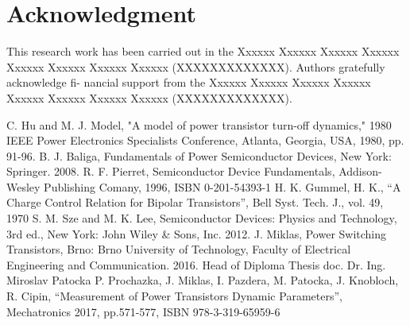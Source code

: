 \documentclass[conference]{IEEEtran}
\begin{document}
\section*{Acknowledgment}
This research work has been carried out in the Xxxxxx
Xxxxxx Xxxxxx Xxxxxx Xxxxxx Xxxxxx Xxxxxx Xxxxxx
(XXXXXXXXXXXXX). Authors gratefully acknowledge fi-
nancial support from the Xxxxxx Xxxxxx Xxxxxx Xxxxxx
Xxxxxx Xxxxxx Xxxxxx Xxxxxx (XXXXXXXXXXXXX).


\begin{thebibliography}{00}
	 C. Hu and M. J. Model, "A model of power transistor turn-off dynamics," 1980 IEEE Power Electronics Specialists Conference, Atlanta, Georgia, USA, 1980, pp. 91-96.
	 B. J. Baliga, Fundamentals of Power Semiconductor Devices, New York: Springer. 2008.
	 R. F. Pierret, {Semiconductor Device Fundamentals}, Addison-Wesley Publishing Comany, 1996, ISBN 0-201-54393-1
	 H. K. Gummel, H. K., ``A Charge Control Relation for Bipolar Transistors'', Bell Syst. Tech. J., vol. 49, 1970
	 S. M. Sze and M. K. Lee, Semiconductor Devices: Physics and Technology, 3rd ed., New York: John Wiley \& Sons, Inc. 2012.
	 J. Miklas, {Power Switching Transistors}, Brno: Brno University of Technology, Faculty of Electrical Engineering and Communication. 2016. Head of Diploma Thesis doc. Dr. Ing. Miroslav Patocka
	 P. Prochazka, J. Miklas, I. Pazdera, M. Patocka, J. Knobloch, R. Cipin, ``Measurement of Power Transistors Dynamic Parameters'', Mechatronics 2017, pp.571-577, ISBN 978-3-319-65959-6


\end{thebibliography}
\end{document}
